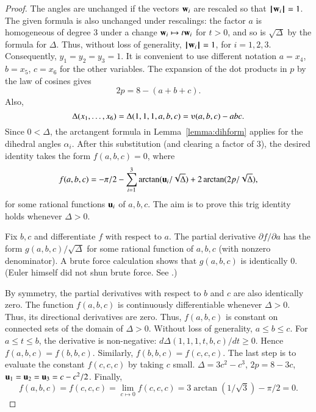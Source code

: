 \begin{proof}
The angles are unchanged if the vectors ${\mathbf w}_i$ are rescaled so that
${{\hskip0.1em|\hskip-0.15em|\hskip0.1em}{\mathbf w}_i{\hskip0.1em|\hskip-0.15em|\hskip0.1em}}=1$.  The given formula is also unchanged under rescalings:
the factor $a$ is homogeneous of degree $3$ under a change ${\mathbf w}_i
\mapsto t {\mathbf w}_i$ for $t>0$, and so is $\sqrt{\Delta}$ by the
formula for $\Delta$.  Thus, without loss of generality, ${{\hskip0.1em|\hskip-0.15em|\hskip0.1em}{\mathbf w}_i{\hskip0.1em|\hskip-0.15em|\hskip0.1em}}=1$, for
$i=1,2,3$.  Consequently, $y_1=y_2=y_3=1$.  It is convenient to use
different notation $a=x_4$, $b=x_5$, $c=x_6$ for the other
variables. The expansion of the dot products in $p$ by the law of cosines
gives
    $$2 p = 8 - (a+b+c).$$
Also, $$\Delta(x_1,\ldots,x_6) = \Delta(1,1,1,a,b,c) =
    \ups(a,b,c) - a b c.$$
Since $0 <\Delta$, the arctangent formula
in Lemma~\ref{lemma:dihform} 
applies for the dihedral angles $\alpha_i$.  After
this substitution (and clearing a factor of $3$),  %
the desired identity takes the form $f(a,b,c)=0$, where
    $$
    f(a,b,c)= -\pi/2 - \sum_{i=1}^3\arctan({\mathbf u}_i/\sqrt{\Delta}) +
    2\arctan(2 p/\sqrt{\Delta}),
    $$
for some rational functions ${\mathbf u}_i$ of $a,b,c$.   The aim is to prove this trig identity holds whenever $\Delta>0$.

Fix $b,c$ and differentiate $f$ with respect
to $a$.  The partial derivative $\partial f/\partial a$ has the form
$g(a,b,c)/\sqrt{\Delta}$ for some rational function of $a,b,c$ (with
nonzero denominator).  A brute force calculation shows that $g(a,b,c)$ is
identically $0$.  (Euler himself did not shun brute force.  See
\cite{Euler}.)

By symmetry, the partial derivatives with respect to $b$ and $c$ are
also identically zero.  The function $f(a,b,c)$  is continuously
differentiable whenever $\Delta>0$.  Thus, its directional
derivatives are zero.  Thus, $f(a,b,c)$ is constant on connected
sets of the domain of $\Delta>0$.  Without loss of generality, $a\le b\le c$.  For $a\le t\le b$,  the derivative is non-negative:
$d\Delta(1,1,1,t,b,c)/dt\ge 0$. Hence $f(a,b,c)=f(b,b,c)$. 
Similarly,
 $f(b,b,c)=f(c,c,c)$. 
The last step is to evaluate the constant $f(c,c,c)$
by taking $c$ small.
$\Delta=3c^2-c^3$, $2p= 8-3c$,  ${\mathbf u}_1={\mathbf u}_2={\mathbf u}_3 = c -c^2/2$.   Finally,
    $$f(a,b,c)= f(c,c,c) = \lim_{c\mapsto0} f(c,c,c) = 
    3 \arctan(1/\sqrt3)-\pi/2 =0.$$
\end{proof}
%






